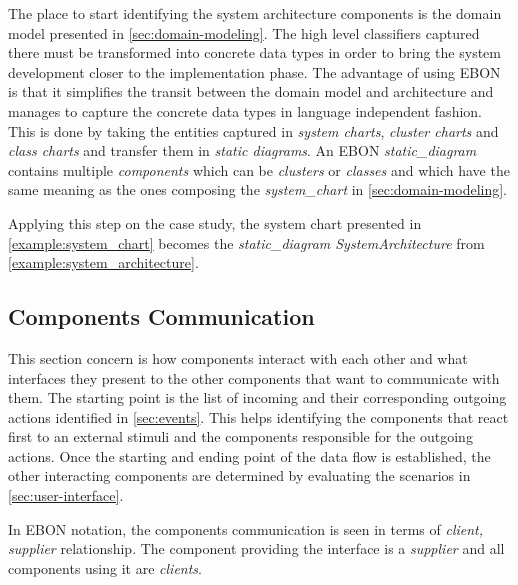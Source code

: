 \documentclass[conference]{IEEEtran}
\begin{document}
The place to start identifying the system architecture components is
the domain model presented in \autoref{sec:domain-modeling}. The high
level classifiers captured there must be transformed into concrete
data types in order to bring the system development closer to the
implementation phase. The advantage of using EBON is that it
simplifies the transit between the domain model and architecture
and manages to capture the concrete data types in language
independent fashion. This is done by taking the entities captured in
\emph{system charts}, \emph{cluster charts} and \emph{class charts} and
transfer them in \emph{static diagrams}. An EBON \emph{static\_diagram}
contains multiple \emph{components} which can be \emph{clusters} or
\emph{classes} and which have the same meaning as the ones composing the
\emph{system\_chart} in \autoref{sec:domain-modeling}.



Applying this step on the case study, the system chart presented in
\autoref{example:system_chart} becomes the \emph{static\_diagram
SystemArchitecture} from
\autoref{example:system_architecture}.


%
\subsection{Components Communication}
\label{sec:comp-comm}

This section concern is how components interact with each other and
what interfaces they present to the other components that want to
communicate with them. The starting point is the list of incoming and
their corresponding outgoing actions identified in
\autoref{sec:events}. This helps identifying the components that react
first to an external stimuli and the components responsible for the
outgoing actions. Once the starting and ending point of the data flow
is established, the other interacting components are determined by
evaluating the scenarios in \autoref{sec:user-interface}. 

In EBON notation, the components communication is seen in terms of
\emph{client, supplier} relationship.  The component providing the
interface is a \emph{supplier} and all components using it are
\emph{clients}.
\end{document}
